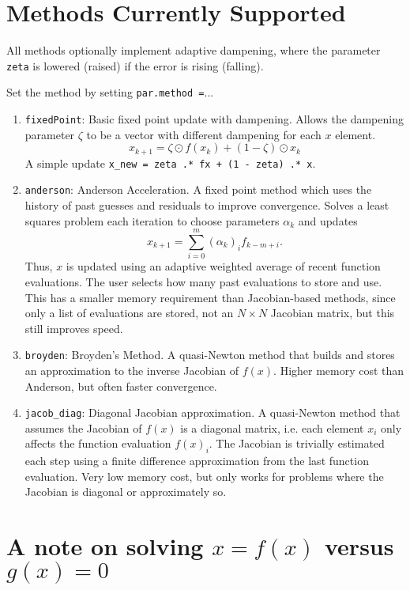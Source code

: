 \documentclass[a4paper,12pt]{article}
\newcommand{\code}[1]{\texttt{#1}}
\begin{document}
\section{Methods Currently Supported}

All methods optionally implement adaptive dampening, where the parameter \code{zeta} is lowered (raised) if the error is rising (falling).

Set the method by setting \code{par.method =}...
\begin{enumerate}
\item \code{fixedPoint}: Basic fixed point update with dampening. Allows the dampening parameter $\zeta$ to be a vector with different dampening for each $x$ element. 
\[
x_{k+1} = \zeta \odot f(x_k) + (1-\zeta) \odot x_k
\]
A simple update \code{x\_new = zeta .* fx + (1 - zeta) .* x}.

\item \code{anderson}: Anderson Acceleration. A fixed point method which uses the history of past guesses and residuals to improve convergence. Solves a least squares problem each iteration to choose parameters $\alpha_k$ and updates
\[
x_{k+1} = \sum_{i=0}^m (\alpha_k)_i f_{k - m + i}.
\]
Thus, $x$ is updated using an adaptive weighted average of recent function evaluations. The user selects how many past evaluations to store and use. This has a smaller memory requirement than Jacobian-based methods, since only a list of evaluations are stored, not an $N \times N$ Jacobian matrix, but this still improves speed. 

\item \code{broyden}: Broyden's Method. A quasi-Newton method that builds and stores an approximation to the inverse Jacobian of $f(x)$. Higher memory cost than Anderson, but often faster convergence. 

\item \code{jacob\_diag}: Diagonal Jacobian approximation. A quasi-Newton method that assumes the Jacobian of $f(x)$ is a diagonal matrix, i.e. each element $x_i$ only affects the function evaluation $f(x)_i$. The Jacobian is trivially estimated each step using a finite difference approximation from the last function evaluation. Very low memory cost, but only works for problems where the Jacobian is diagonal or approximately so. 

\end{enumerate}


\section{A note on solving $x = f(x)$ versus $g(x) = 0$}
\end{document}
